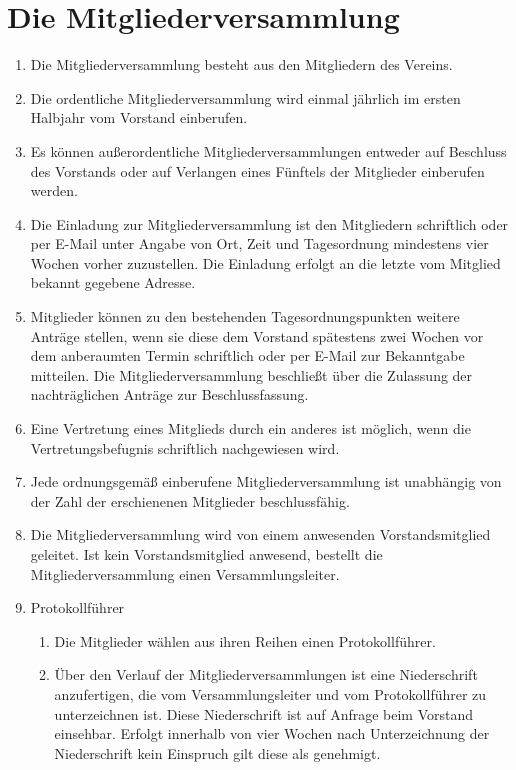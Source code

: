 \documentclass[a4paper, 12pt]{scrartcl}
\begin{document}
\section{Die Mitgliederversammlung}
\label{die-mv}
\begin{enumerate}
	\item Die Mitgliederversammlung besteht aus den Mitgliedern des Vereins.
	\item Die ordentliche Mitgliederversammlung wird einmal jährlich im ersten Halbjahr vom Vorstand einberufen.
	\item Es können außerordentliche Mitgliederversammlungen entweder auf Beschluss des Vorstands oder auf Verlangen eines Fünftels der Mitglieder einberufen werden.
	\item \label{mv-einladung} Die Einladung zur Mitgliederversammlung ist den Mitgliedern schriftlich oder per E-Mail unter Angabe von Ort, Zeit und Tagesordnung mindestens vier Wochen vorher zuzustellen. Die Einladung erfolgt an die letzte vom Mitglied bekannt gegebene Adresse.
	\item \label{mv-nachtrag} Mitglieder können zu den bestehenden Tagesordnungspunkten weitere Anträge stellen, wenn sie diese dem Vorstand spätestens zwei Wochen vor dem anberaumten Termin schriftlich oder per E-Mail zur Bekanntgabe mitteilen. Die Mitgliederversammlung beschließt über die Zulassung der nachträglichen Anträge zur Beschlussfassung.
	\item Eine Vertretung eines Mitglieds durch ein anderes ist möglich, wenn die Vertretungsbefugnis schriftlich nachgewiesen wird.
	\item Jede ordnungsgemäß einberufene Mitgliederversammlung ist
    unabhängig von der Zahl der erschienenen Mitglieder
    beschlussfähig.
	\item Die Mitgliederversammlung wird von einem anwesenden Vorstandsmitglied geleitet. Ist kein Vorstandsmitglied anwesend, bestellt die Mitgliederversammlung einen Versammlungsleiter.
	\item{Protokollführer}
		\begin{enumerate}
			\item Die Mitglieder wählen aus ihren Reihen einen Protokollführer.
			\item Über den Verlauf der Mitgliederversammlungen ist eine Niederschrift anzufertigen, die vom Versammlungsleiter und vom Protokollführer zu unterzeichnen ist. Diese Niederschrift ist auf Anfrage beim Vorstand einsehbar. Erfolgt innerhalb von vier Wochen nach Unterzeichnung der Niederschrift kein Einspruch gilt diese als genehmigt.

\end{enumerate}
\end{enumerate}
\end{document}
